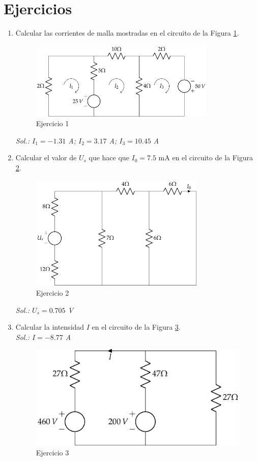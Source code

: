 \section{Ejercicios}
\begin{enumerate}
\item Calcular las corrientes de malla mostradas en el circuito de la Figura \ref{fig.ejercicio2_tema1}.
		\begin{figure}[H]
			\centering	\includegraphics[height=3.7cm]{../figs/ej2_BT1.pdf}
			\caption{Ejercicio 1}
			\label{fig.ejercicio2_tema1}
		\end{figure}
		\emph{Sol.: $I_1=-1.31$ A; $I_2=3.17$ A; $I_3=10.45$ A}
		
\item Calcular el valor de $U_s$ que hace que $I_0=7.5$ mA en el circuito de la Figura \ref{fig.ejercicio3_tema1}. 
		\begin{figure}[H]
			\centering	\includegraphics[height=5.5cm]{../figs/ej3_BT1.pdf}
			\caption{Ejercicio 2}
			\label{fig.ejercicio3_tema1}
		\end{figure}
		\emph{Sol.: $U_s=0.705$ V}    
		
\item Calcular la intensidad $I$ en el circuito de la Figura \ref{fig.ejercicio4_tema1}. \\
\emph{Sol.: $I=-8.77 $ A}
		\begin{figure}[H]
			\centering
			\includegraphics{../figs/ej4_BT1.pdf}
			\caption{Ejercicio 3}
			\label{fig.ejercicio4_tema1}
		\end{figure}
		

\end{enumerate}
